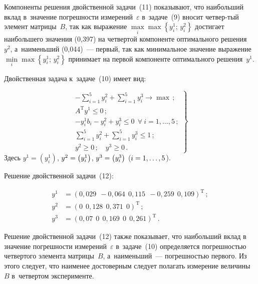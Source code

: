 \begin{multicols}{2}
  Компоненты решения двойственной задачи~(11) показывают, что
наибольший вклад в~значение погрешности измерений~$\varepsilon$
в~задаче~(9) вносит четвер-\linebreak тый элемент матрицы~$B$, так как выражение
$\max\limits_i\max \left\{ y_i^1;\,y_i^2\right\}$ достигает наибольшего значения
(0,397) на четвертой компоненте оптимального решения~$y^2$, а~наименьший
(0,044)~--- первый, так как минимальное значение выражение $\min\limits_i\max
\left\{ y_i^1;\,y_i^2\right\}$ принимает на первой компоненте оптимального
решения~$y^1$.

  Двойственная задача к~задаче~(10) имеет вид:

\noindent
  \begin{equation}
  \left.
  \begin{array}{c}
  \displaystyle -\sum\limits_{i=1}^5 y_i^2 +\sum\limits_{i=1}^5 y_i^3\to
\max\,;\\[12pt]
  A^{\mathrm{T}} y^1\leq0\,;\\[1pt]
  -y_i^1 b_i -y_i^2 +y_i^3\leq 0\ \ \forall\ i=1,\ldots, 5\,;\\[6pt]
  \displaystyle  \sum\limits_{i=1}^5 y_i^2 +\sum\limits_{i=1}^5 y_i^3\leq1\,;\\[12pt]
  y^2\geq0\,;\quad y^3\geq0\,.
  \end{array}
  \right\}
  \label{e12-spi}
  \end{equation}
  Здесь $y^1=\left( y_i^1\right)$, $y^2\hm= \left( y_i^1\right)$, $y^3\hm= \left(
y_i^3\right)$ ($i\hm= 1,\ldots, 5$).

  Решение двойственной задачи~(12):

  \noindent
  \begin{align*}
  y^1 &= \left( 0{,}029\ \ -0{,}064\ \ 0{,}115\ \ -0{,}259\ \
0{,}109\right)^{\mathrm{T}}\,;\\
  y^2 &= \left( 0\ \ 0{,}128\ \ 0{,}371\ \ 0\right)^{\mathrm{T}}\,;\\
  y^3 &= \left( 0{,}07\ \ 0\ \ 0{,}169\ \ 0\ \ 0{,}261\right)^{\mathrm{T}}\,.
  \end{align*}

  Решение двойственной задачи~(12) также показывает, что наибольший вклад
в значение погрешности измерений~$\varepsilon$ в~задаче~(10) определяется
погреш\-ностью четвертого элемента матрицы~$B$, а~наименьший~---
погрешностью первого. Из этого следует, что наименее достоверным следует
полагать измерение величины~$B$ в~четвертом эксперименте.


\end{multicols}

